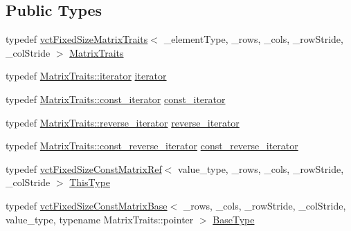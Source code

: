 \subsection*{Public Types}
\begin{DoxyCompactItemize}
\item 
typedef \hyperlink{classvct_fixed_size_matrix_traits}{vct\+Fixed\+Size\+Matrix\+Traits}$<$ \+\_\+element\+Type, \+\_\+rows, \+\_\+cols, \+\_\+row\+Stride, \+\_\+col\+Stride $>$ \hyperlink{classvct_fixed_size_const_matrix_ref_ac6b99932c13ec23f2c083fc719af757e}{Matrix\+Traits}
\item 
typedef \hyperlink{classvct_fixed_size_matrix_traits_a677065481ada218e2559cdec92e97fd8}{Matrix\+Traits\+::iterator} \hyperlink{classvct_fixed_size_const_matrix_ref_aabd708b8d6137ad684ee64e121c645b2}{iterator}
\item 
typedef \hyperlink{classvct_fixed_size_matrix_traits_a8f7178fb03f45772c705fba16e08065d}{Matrix\+Traits\+::const\+\_\+iterator} \hyperlink{classvct_fixed_size_const_matrix_ref_ab035e90a0971ab4bf03d819b5bd31ecc}{const\+\_\+iterator}
\item 
typedef \hyperlink{classvct_fixed_size_matrix_traits_aa132098455575ae9bc4962c994273baa}{Matrix\+Traits\+::reverse\+\_\+iterator} \hyperlink{classvct_fixed_size_const_matrix_ref_a1c9aa87e0184cf645405b6c8618f1223}{reverse\+\_\+iterator}
\item 
typedef \hyperlink{classvct_fixed_size_matrix_traits_a362cff0931f811552609307e80af3eab}{Matrix\+Traits\+::const\+\_\+reverse\+\_\+iterator} \hyperlink{classvct_fixed_size_const_matrix_ref_a65f582be5b2d72ce89267a7255605844}{const\+\_\+reverse\+\_\+iterator}
\item 
typedef \hyperlink{classvct_fixed_size_const_matrix_ref}{vct\+Fixed\+Size\+Const\+Matrix\+Ref}$<$ value\+\_\+type, \+\_\+rows, \+\_\+cols, \+\_\+row\+Stride, \+\_\+col\+Stride $>$ \hyperlink{classvct_fixed_size_const_matrix_ref_a725e99847915984b03843f96054b07d5}{This\+Type}
\item 
typedef \hyperlink{classvct_fixed_size_const_matrix_base}{vct\+Fixed\+Size\+Const\+Matrix\+Base}$<$ \+\_\+rows, \+\_\+cols, \+\_\+row\+Stride, \+\_\+col\+Stride, value\+\_\+type, typename Matrix\+Traits\+::pointer $>$ \hyperlink{classvct_fixed_size_const_matrix_ref_ac3466e6a4fd2ab31f5f15265e09006d3}{Base\+Type}
\end{DoxyCompactItemize}
